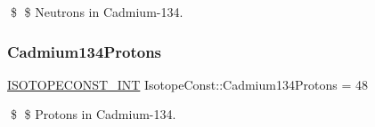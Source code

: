 \$ \$ Neutrons in Cadmium-\/134. \mbox{\label{group___isotope_const-_cadmium-_cd134_gade406317094d2750c84bfbcce1f08710}} 
\subsubsection{\texorpdfstring{Cadmium134\+Protons}{Cadmium134Protons}}
{\footnotesize\ttfamily \mbox{\hyperlink{group___isotope_const-_macros_ga5f18360b3e99483a35c32d789e62621c}{I\+S\+O\+T\+O\+P\+E\+C\+O\+N\+S\+T\+\_\+\+I\+NT}} Isotope\+Const\+::\+Cadmium134\+Protons = 48}

\$ \$ Protons in Cadmium-\/134. 